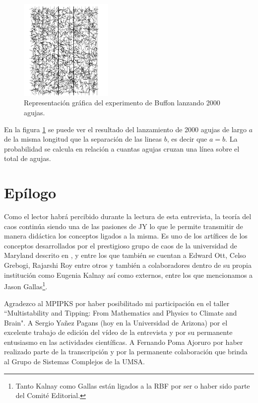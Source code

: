 \documentclass{rbf}
\begin{document}
\begin{figure}[tbp!]
 \centering
  \includegraphics[width=0.4\textwidth]{figures/buffon.jpg}
	\caption{Representación gráfica del experimento de Buffon lanzando 2000 agujas.\cite{Statistics}}
 \label{buff}
\end{figure}


En la figura \ref{buff} se puede ver el resultado del lanzamiento de 2000 agujas de largo $a$ de la misma longitud que la separación de las lineas $b$, es decir que $a=b$. La probabilidad se calcula en relación a cuantas agujas cruzan una línea sobre el total de agujas. 



\section{Epílogo}\label{epi}
Como el lector habrá percibido durante la lectura de esta entrevista, la teoría del caos continúa siendo una de las pasiones de JY lo que le permite transmitir de manera didáctica los conceptos ligados a la misma. Es uno de los artífices de los conceptos desarrollados por el prestigioso grupo de caos de la universidad de Maryland descrito en \cite{UMD17}, y entre los que también se cuentan a Edward Ott, Celso Grebogi, Rajarshi Roy entre otros y también a colaboradores dentro de su propia institución como Eugenia Kalnay así como externos, entre los que mencionamos a Jason Gallas\footnote{Tanto Kalnay como Gallas están ligados a la RBF por ser o haber sido parte del Comité Editorial.}.

\begin{acknowledgments}
Agradezco al MPIPKS por haber posibilitado mi participación en el taller ``Multistability and Tipping: From Mathematics and Physics to Climate and Brain". A Sergio Yañez Pagans (hoy en la Universidad de Arizona) por el excelente trabajo de edición del vídeo de la entrevista y por su permanente entusiasmo en las actividades científicas. A Fernando Poma Ajoruro por haber realizado parte de la transcripción y por la permanente colaboración que brinda al Grupo de Sistemas Complejos de la UMSA.
\end{acknowledgments}
\end{document}
